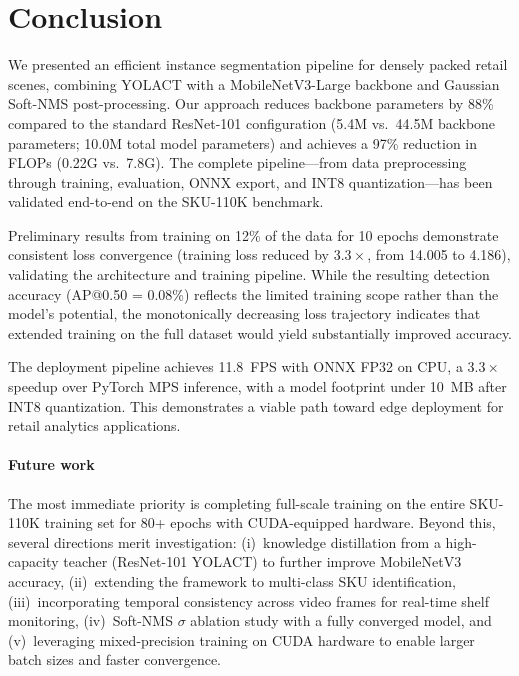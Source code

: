\documentclass[conference]{IEEEtran}
\begin{document}
\section{Conclusion}
\label{sec:conclusion}

We presented an efficient instance segmentation pipeline for densely
packed retail scenes, combining YOLACT with a MobileNetV3-Large backbone
and Gaussian Soft-NMS post-processing. Our approach reduces backbone
parameters by 88\% compared to the standard ResNet-101 configuration
(5.4M vs.\ 44.5M backbone parameters; 10.0M total model parameters)
and achieves a 97\% reduction in FLOPs (0.22G vs.\ 7.8G). The complete
pipeline---from data preprocessing through training, evaluation, ONNX
export, and INT8 quantization---has been validated end-to-end on the
SKU-110K benchmark.

Preliminary results from training on 12\% of the data for 10 epochs
demonstrate consistent loss convergence (training loss reduced by
$3.3\times$, from 14.005 to 4.186), validating the architecture and
training pipeline. While the resulting detection accuracy (AP@0.50 =
0.08\%) reflects the limited training scope rather than the model's
potential, the monotonically decreasing loss trajectory indicates that
extended training on the full dataset would yield substantially improved
accuracy.

The deployment pipeline achieves 11.8~FPS with ONNX FP32 on CPU, a
$3.3\times$ speedup over PyTorch MPS inference, with a model footprint
under 10~MB after INT8 quantization. This demonstrates a viable path
toward edge deployment for retail analytics applications.

\paragraph{Future work}
The most immediate priority is completing full-scale training on the
entire SKU-110K training set for 80+ epochs with CUDA-equipped hardware.
Beyond this, several directions merit investigation:
(i)~knowledge distillation from a high-capacity teacher (ResNet-101
YOLACT) to further improve MobileNetV3 accuracy,
(ii)~extending the framework to multi-class SKU identification,
(iii)~incorporating temporal consistency across video frames for
real-time shelf monitoring,
(iv)~Soft-NMS $\sigma$ ablation study with a fully converged model, and
(v)~leveraging mixed-precision training on CUDA hardware to enable
larger batch sizes and faster convergence.



\end{document}

